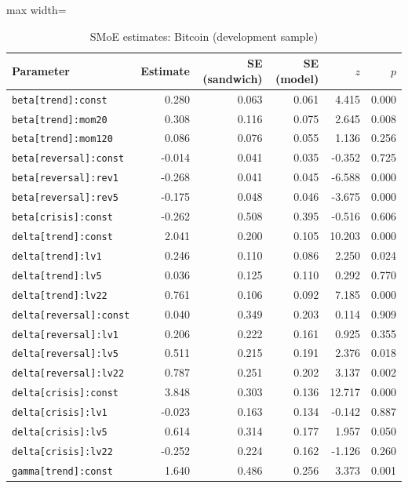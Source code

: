 \begin{table}[!htbp]\centering\scriptsize
\caption{SMoE estimates: Bitcoin (development sample)}\label{tab:params_btc}
\begin{adjustbox}{max width=\textwidth}
\begin{tabular}{lrrrrr}
\toprule
Parameter & Estimate & SE (sandwich) & SE (model) & $z$ & $p$\\
\midrule
\texttt{beta[trend]:const} & 0.280 & 0.063 & 0.061 & 4.415 & 0.000\\
\texttt{beta[trend]:mom20} & 0.308 & 0.116 & 0.075 & 2.645 & 0.008\\
\texttt{beta[trend]:mom120} & 0.086 & 0.076 & 0.055 & 1.136 & 0.256\\
\texttt{beta[reversal]:const} & -0.014 & 0.041 & 0.035 & -0.352 & 0.725\\
\texttt{beta[reversal]:rev1} & -0.268 & 0.041 & 0.045 & -6.588 & 0.000\\
\texttt{beta[reversal]:rev5} & -0.175 & 0.048 & 0.046 & -3.675 & 0.000\\
\texttt{beta[crisis]:const} & -0.262 & 0.508 & 0.395 & -0.516 & 0.606\\
\texttt{delta[trend]:const} & 2.041 & 0.200 & 0.105 & 10.203 & 0.000\\
\texttt{delta[trend]:lv1} & 0.246 & 0.110 & 0.086 & 2.250 & 0.024\\
\texttt{delta[trend]:lv5} & 0.036 & 0.125 & 0.110 & 0.292 & 0.770\\
\texttt{delta[trend]:lv22} & 0.761 & 0.106 & 0.092 & 7.185 & 0.000\\
\texttt{delta[reversal]:const} & 0.040 & 0.349 & 0.203 & 0.114 & 0.909\\
\texttt{delta[reversal]:lv1} & 0.206 & 0.222 & 0.161 & 0.925 & 0.355\\
\texttt{delta[reversal]:lv5} & 0.511 & 0.215 & 0.191 & 2.376 & 0.018\\
\texttt{delta[reversal]:lv22} & 0.787 & 0.251 & 0.202 & 3.137 & 0.002\\
\texttt{delta[crisis]:const} & 3.848 & 0.303 & 0.136 & 12.717 & 0.000\\
\texttt{delta[crisis]:lv1} & -0.023 & 0.163 & 0.134 & -0.142 & 0.887\\
\texttt{delta[crisis]:lv5} & 0.614 & 0.314 & 0.177 & 1.957 & 0.050\\
\texttt{delta[crisis]:lv22} & -0.252 & 0.224 & 0.162 & -1.126 & 0.260\\
\texttt{gamma[trend]:const} & 1.640 & 0.486 & 0.256 & 3.373 & 0.001\\

\end{tabular}
\end{adjustbox}
\end{table}
